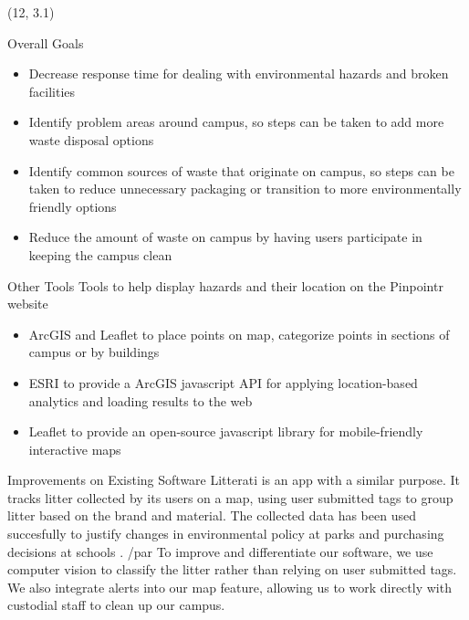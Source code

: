 \documentclass[22pt]{beamer}
\begin{document}
\begin{frame}[fragile]
\begin{textblock}{3.5}
\end{textblock}

\begin{textblock}{3.5}(12, 3.1)
\begin{block}{Overall Goals}
\begin{itemize}
\item Decrease response time for dealing with environmental hazards and broken facilities
\item Identify problem areas around campus, so steps can be taken to add more waste disposal options
\item Identify common sources of waste that originate on campus, so steps can be taken to reduce unnecessary packaging or transition to more environmentally friendly options
\item Reduce the amount of waste on campus by having users participate in keeping the campus clean
\end{itemize}
\end{block}

\begin{block}{Other Tools}
Tools to help display hazards and their location on the Pinpointr website
\begin{itemize}
\item ArcGIS and Leaflet to place points on map, categorize points in sections of campus or by buildings
\item ESRI to provide a ArcGIS javascript API for applying location-based analytics and loading results to the web
\item Leaflet to provide an open-source javascript library for mobile-friendly interactive maps
\end{itemize}
\end{block}

\begin{block}{Improvements on Existing Software}
Litterati is an app with a similar purpose. It tracks litter collected by its users on a map, using user submitted tags to group litter based on the brand and material. The collected data has been used succesfully to justify changes in environmental policy at parks and purchasing decisions at schools \cite{litterati}. /par
To improve and differentiate our software, we use computer vision to classify the litter rather than relying on user submitted tags. We also integrate alerts into our map feature, allowing us to work directly with custodial staff to clean up our campus.
\end{block}


\end{textblock}
\end{frame}
\end{document}
